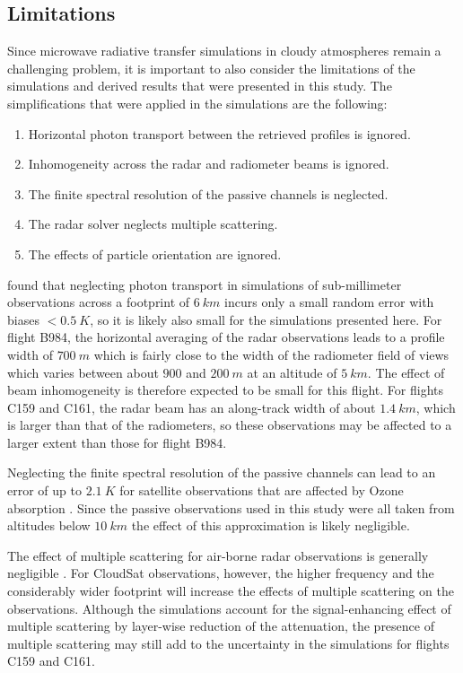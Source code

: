 \documentclass[journal abbreviation, manuscript]{copernicus}
\begin{document}
\subsection{Limitations}

Since microwave radiative transfer simulations in cloudy atmospheres remain a
challenging problem, it is important to also consider the limitations of the
simulations and derived results that were presented in this study. The
simplifications that were applied in the simulations are the following:
\begin{enumerate}
  \item Horizontal photon transport between the retrieved profiles is ignored.
  \item Inhomogeneity across the radar and radiometer beams is ignored.
  \item The finite spectral resolution of the passive channels is neglected.
  \item The radar solver neglects multiple scattering.
  \item The effects of particle orientation are ignored.
\end{enumerate}

\citet{barlakas20} found that neglecting photon transport in simulations of
sub-millimeter observations across a footprint of $6\ \unit{km}$ incurs only a
small random error with biases $< 0.5\ \unit{K}$, so it is likely also small for
the simulations presented here. For flight B984, the horizontal averaging of the
radar observations leads to a profile width of $700\ \unit{m}$ which is fairly
close to the width of the radiometer field of views which varies between about
$900$ and $200\ \unit{m}$ at an altitude of $5\ \unit{km}$. The effect of beam
inhomogeneity is therefore expected to be small for this flight. For flights
C159 and C161, the radar beam has an along-track width of about
$1.4\ \unit{km}$, which is larger than that of the radiometers, so these
observations may be affected to a larger extent than those for flight B984.

Neglecting the finite spectral resolution of the passive channels can lead to an
error of up to $2.1\ \unit{K}$ for satellite observations that are affected by
Ozone absorption \citep{eriksson20}. Since the passive observations used in this
study were all taken from altitudes below $10\ \unit{km}$ the effect of this
approximation is likely negligible.

The effect of multiple scattering for air-borne radar observations is generally
negligible \citep{battaglia10}. For CloudSat observations, however, the higher
frequency and the considerably wider footprint will increase the effects of
multiple scattering on the observations. Although the simulations account for
the signal-enhancing effect of multiple scattering by layer-wise reduction of
the attenuation, the presence of multiple scattering may still add to the
uncertainty in the simulations for flights C159 and C161.
\end{document}
